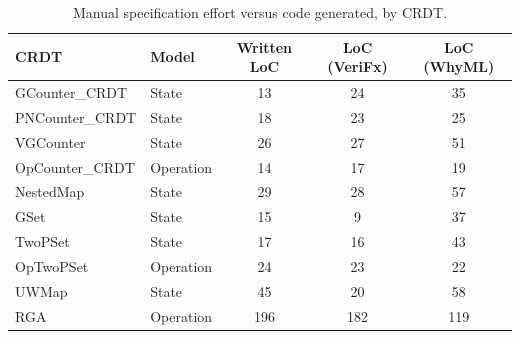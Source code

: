 \begin{table}[htbp]
    \centering
    \begin{tabular}{l | l | c | c | c}
        \textbf{CRDT} & \textbf{Model} & \textbf{Written LoC} & \textbf{LoC (VeriFx)} & \textbf{LoC (WhyML)} \\
        \hline
        GCounter\_CRDT  & State     & 13  & 24  & 35 \\
        PNCounter\_CRDT & State     & 18  & 23  & 25 \\
        VGCounter       & State     & 26  & 27  & 51 \\
        OpCounter\_CRDT & Operation & 14  & 17  & 19 \\
        NestedMap       & State     & 29  & 28  & 57 \\
        GSet            & State     & 15  & 9   & 37 \\
        TwoPSet         & State     & 17  & 16  & 43 \\
        OpTwoPSet       & Operation & 24  & 23  & 22 \\
        UWMap           & State     & 45  & 20  & 58 \\
        RGA             & Operation & 196 & 182 & 119 \\
    \end{tabular}
    \vspace{0.2cm}
    \caption{Manual specification effort versus code generated, by CRDT.}
    \label{tab:loc}
\end{table}

